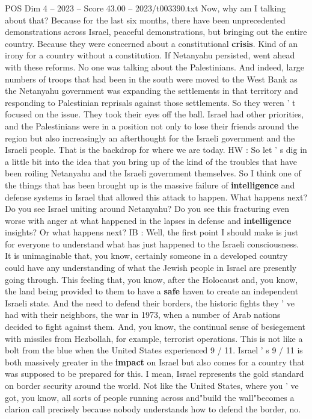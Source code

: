 \begin{textsample}{POS Dim 4 – 2023 – Score 43.00 – 2023/t003390.txt}
Now, why am I talking about that?
Because for the last six months, there have been unprecedented demonstrations across Israel, peaceful demonstrations, but bringing out the entire country.
Because they were concerned about a constitutional \textbf{crisis}.
Kind of an irony for a country without a constitution.
If Netanyahu persisted, went ahead with these reforms.
No one was talking about the Palestinians.
And indeed, large numbers of troops that had been in the south were moved to the West Bank as the Netanyahu government was expanding the settlements in that territory and responding to Palestinian reprisals against those settlements.
So they weren ' t focused on the issue.
They took their eyes off the ball.
Israel had other priorities, and the Palestinians were in a position not only to lose their friends around the region but also increasingly an afterthought for the Israeli government and the Israeli people.
That is the backdrop for where we are today.
HW : So let ' s dig in a little bit into the idea that you bring up of the kind of the troubles that have been roiling Netanyahu and the Israeli government themselves.
So I think one of the things that has been brought up is the massive failure of \textbf{intelligence} and defense systems in Israel that allowed this attack to happen.
What happens next?
Do you see Israel uniting around Netanyahu?
Do you see this fracturing even worse with anger at what happened in the lapses in defense and \textbf{intelligence} insights?
Or what happens next?
IB : Well, the first point I should make is just for everyone to understand what has just happened to the Israeli consciousness.
It is unimaginable that, you know, certainly someone in a developed country could have any understanding of what the Jewish people in Israel are presently going through.
This feeling that, you know, after the Holocaust and, you know, the land being provided to them to have a \textbf{safe} haven to create an independent Israeli state.
And the need to defend their borders, the historic fights they ' ve had with their neighbors, the war in 1973, when a number of Arab nations decided to fight against them.
And, you know, the continual sense of besiegement with missiles from Hezbollah, for example, terrorist operations.
This is not like a bolt from the blue when the United States experienced 9 / 11.
Israel ' s 9 / 11 is both massively greater in the \textbf{impact} on Israel but also comes for a country that was supposed to be prepared for this.
I mean, Israel represents the gold standard on border security around the world.
Not like the United States, where you ' ve got, you know, all sorts of people running across and"build the wall"becomes a clarion call precisely because nobody understands how to defend the border, no.

\end{textsample}

